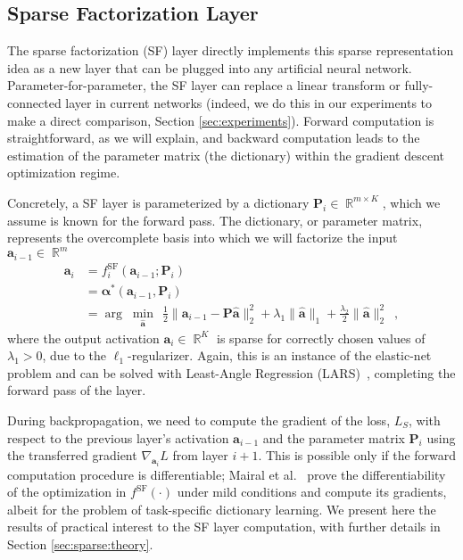 \documentclass[10pt,twocolumn,letterpaper]{article}
\newcommand{\reals}{\mathop \mathbb{R}}
\newcommand{\argmnmz}[1][]{\ensuremath{\arg\;\underset{#1}{\min}\:\:}}
\renewcommand{\vec}{\mathbf}
\newcommand{\grad}[2]{\nabla_{\!\! #1} #2}
\renewcommand{\P}{\vec{P}}
\renewcommand{\a}{\vec{a}}
\newcommand{\balpha}{\boldsymbol{\alpha}}
\newcommand{\fSF}{^{\text{SF}}}
\begin{document}
\subsection{Sparse Factorization Layer}
\label{sec:sflayer}

The sparse factorization (SF) layer directly implements this sparse representation idea as a new layer that can be plugged into any artificial neural network.  Parameter-for-parameter, the SF layer can replace a linear transform or fully-connected layer in current networks (indeed, we do this in our experiments to make a direct comparison, Section \ref{sec:experiments}).  Forward computation is straightforward, as we will explain, and backward computation leads to the estimation of the parameter matrix (the dictionary) within the gradient descent optimization regime. 

Concretely, a SF layer is parameterized by a dictionary $\P_i\in\reals^{m\times 
K}$, which we assume is known for the forward pass.  The dictionary, or 
parameter matrix, represents the overcomplete basis into which we will 
factorize the input $\a_{i-1}\in\reals^m$ 
\begin{align}
    \a_i & = f\fSF_i(\a_{i-1};\P_i) \label{eq:sflayer}\\
         & = \balpha^*(\a_{i-1},\P_i) \nonumber\\
         & = \argmnmz[\hat{\a}] \frac{1}{2}  \lVert 
         \a_{i-1}-\P\hat{\a}\rVert_2^2 +
      \lambda_1\lVert\hat{\a}\rVert_1+\frac{\lambda_2}{2}\lVert\hat{\a}\rVert_2^2
\enspace,
\nonumber
\end{align}
\noindent where the output activation $\a_i \in \reals^{K}$ is sparse for 
correctly chosen values of $\lambda_1>0$, due to the $\ell_1$-regularizer.  
Again, this is an instance of the elastic-net problem and can be solved with 
Least-Angle Regression (LARS)~\cite{EfHaJoAnnals2004}, completing the forward 
pass of the layer.

During backpropagation, we need to compute the gradient of the loss, $L_S$, with respect to the previous layer's activation $\a_{i-1}$ and the parameter matrix $\P_i$ using the transferred gradient $\grad{\a_i}{L}$ from layer $i+1$. This is possible only if the forward computation procedure is differentiable; Mairal et al.~\cite{MaBaPoTPAMI2012} prove the differentiability of the optimization in $f\fSF(\cdot)$ under mild conditions and compute its gradients, albeit for the problem of task-specific dictionary learning. We present here the results of practical interest to the SF layer computation, with further details in Section \ref{sec:sparse:theory}.
\end{document}
